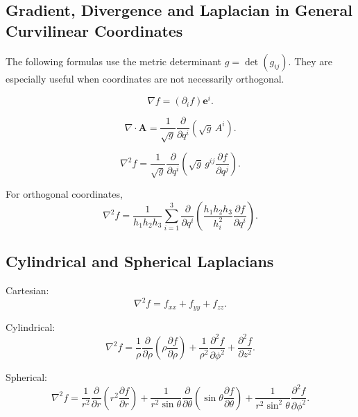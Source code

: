 \documentclass{otscience}
\begin{document}
\subsection{Gradient, Divergence and Laplacian in General Curvilinear Coordinates}

The following formulas use the metric determinant \(g=\det(g_{ij})\). They are especially useful when coordinates are not necessarily orthogonal.

\begin{formulabox}
    \[
        \nabla f=(\partial_i f)\mathbf{e}^i.
    \]

    \[
        \nabla\cdot\mathbf{A}=\frac{1}{\sqrt{g}}\frac{\partial}{\partial q^i}\left(\sqrt{g}\,A^i\right).
    \]

    \[
        \nabla^2f=\frac{1}{\sqrt{g}}\frac{\partial}{\partial q^i}\left(\sqrt{g}\,g^{ij}\frac{\partial f}{\partial q^j}\right).
    \]

    For orthogonal coordinates,
    \[
        \nabla^2 f=\frac{1}{h_1h_2h_3}\sum_{i=1}^{3}\frac{\partial}{\partial q^i}\left(\frac{h_1h_2h_3}{h_i^2}\frac{\partial f}{\partial q^i}\right).
    \]
\end{formulabox}

\subsection{Cylindrical and Spherical Laplacians}

\begin{formulabox}
    Cartesian:
    \[
        \nabla^2f=f_{xx}+f_{yy}+f_{zz}.
    \]

    Cylindrical:
    \[
        \nabla^2f=\frac{1}{\rho}\frac{\partial}{\partial\rho}\left(\rho\frac{\partial f}{\partial\rho}\right)+\frac{1}{\rho^2}\frac{\partial^2f}{\partial\phi^2}+\frac{\partial^2f}{\partial z^2}.
    \]

    Spherical:
    \[
        \nabla^2f=\frac{1}{r^2}\frac{\partial}{\partial r}\left(r^2\frac{\partial f}{\partial r}\right)
        +\frac{1}{r^2\sin\theta}\frac{\partial}{\partial\theta}\left(\sin\theta\frac{\partial f}{\partial\theta}\right)
        +\frac{1}{r^2\sin^2\theta}\frac{\partial^2f}{\partial\phi^2}.
    \]
\end{formulabox}
\end{document}
